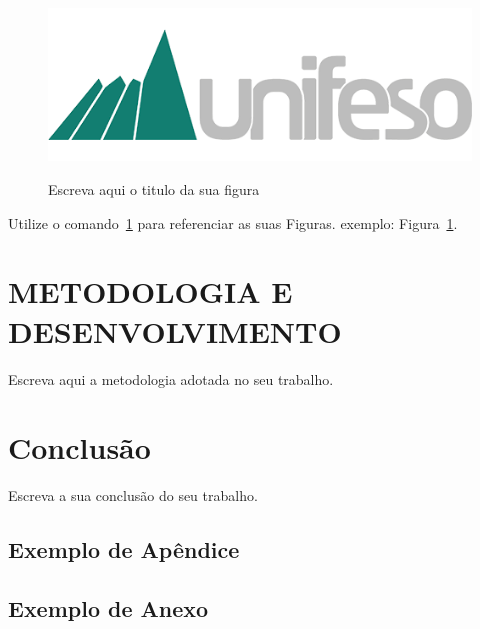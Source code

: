 \documentclass[
	12pt,				%
	openright,			%
	oneside,			%
	a4paper,			%
	english,			%
	brazil				%
	]{abntex2}
\theoremstyle{definition}
\begin{document}
\begin{figure}[!h]
\centering
\caption{Escreva aqui o titulo da sua figura}
\includegraphics[scale=0.5]{UNIFESO.png}
\label{unifeso}
\end{figure}

Utilize o comando~\ref{unifeso} para referenciar as suas Figuras.
exemplo: Figura~\ref{unifeso}.

\chapter[METODOLOGIA E DESENVOLVIMENTO]{METODOLOGIA E DESENVOLVIMENTO}

Escreva aqui a metodologia adotada no seu trabalho.

\chapter{Conclusão}

Escreva a sua conclusão do seu trabalho.


\postextual{}

\nocite{angular2024, dotnet2024, sqlserver2024}

  

\begin{apendicesenv}
\partapendices{}
\chapter{Exemplo de Apêndice}
\end{apendicesenv}

\begin{anexosenv}
\partanexos{}
\chapter{Exemplo de Anexo}
\end{anexosenv}
\end{document}
